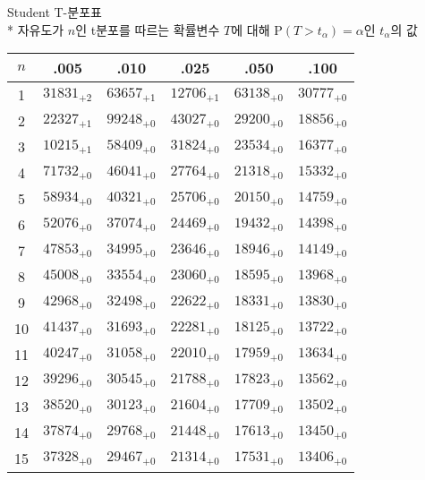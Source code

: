 \documentclass[10pt, a4paper]{article}
\begin{document}
\begin{center}
    \huge{Student T-분포표}\normalsize\\
    * 자유도가 \(n\)인 t분포를 따르는 확률변수 \(T\)에 대해 \(\mathrm{P}\left(T > t_\alpha\right) = \alpha\)인 \(t_\alpha\)의 값\\
    \begin{longtable}{c || c c c c c}
        \(n\) & .005 & .010 & .025 & .050 & .100\\
        \hline\hline
        1 & \({31831}_{+2}\) & \({63657}_{+1}\) & \({12706}_{+1}\) & \({63138}_{+0}\) & \({30777}_{+0}\)\\
        2 & \({22327}_{+1}\) & \({99248}_{+0}\) & \({43027}_{+0}\) & \({29200}_{+0}\) & \({18856}_{+0}\)\\
        3 & \({10215}_{+1}\) & \({58409}_{+0}\) & \({31824}_{+0}\) & \({23534}_{+0}\) & \({16377}_{+0}\)\\
        4 & \({71732}_{+0}\) & \({46041}_{+0}\) & \({27764}_{+0}\) & \({21318}_{+0}\) & \({15332}_{+0}\)\\
        5 & \({58934}_{+0}\) & \({40321}_{+0}\) & \({25706}_{+0}\) & \({20150}_{+0}\) & \({14759}_{+0}\)\\
        \hline
        6 & \({52076}_{+0}\) & \({37074}_{+0}\) & \({24469}_{+0}\) & \({19432}_{+0}\) & \({14398}_{+0}\)\\
        7 & \({47853}_{+0}\) & \({34995}_{+0}\) & \({23646}_{+0}\) & \({18946}_{+0}\) & \({14149}_{+0}\)\\
        8 & \({45008}_{+0}\) & \({33554}_{+0}\) & \({23060}_{+0}\) & \({18595}_{+0}\) & \({13968}_{+0}\)\\
        9 & \({42968}_{+0}\) & \({32498}_{+0}\) & \({22622}_{+0}\) & \({18331}_{+0}\) & \({13830}_{+0}\)\\
        10 & \({41437}_{+0}\) & \({31693}_{+0}\) & \({22281}_{+0}\) & \({18125}_{+0}\) & \({13722}_{+0}\)\\
        \hline
        11 & \({40247}_{+0}\) & \({31058}_{+0}\) & \({22010}_{+0}\) & \({17959}_{+0}\) & \({13634}_{+0}\)\\
        12 & \({39296}_{+0}\) & \({30545}_{+0}\) & \({21788}_{+0}\) & \({17823}_{+0}\) & \({13562}_{+0}\)\\
        13 & \({38520}_{+0}\) & \({30123}_{+0}\) & \({21604}_{+0}\) & \({17709}_{+0}\) & \({13502}_{+0}\)\\
        14 & \({37874}_{+0}\) & \({29768}_{+0}\) & \({21448}_{+0}\) & \({17613}_{+0}\) & \({13450}_{+0}\)\\
        15 & \({37328}_{+0}\) & \({29467}_{+0}\) & \({21314}_{+0}\) & \({17531}_{+0}\) & \({13406}_{+0}\)\\

\end{longtable}
\end{center}
\end{document}
